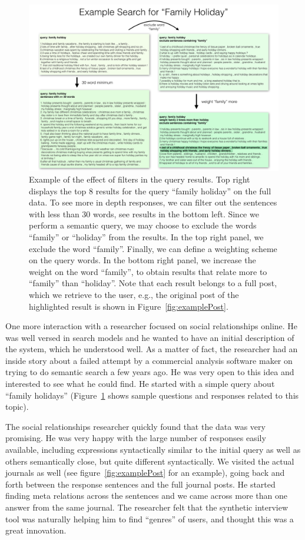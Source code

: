 \documentclass{sigchi}
\begin{document}
\begin{figure}[ht]
\centering \includegraphics[width=.85\textwidth]{figures/results_1}
\caption{Example of the effect of filters in the query results. 
Top right displays the top 8 results for the query ``family holiday'' on the full data. To see more in depth responses, we can filter out the sentences with less than 30 words, see results in the bottom left. Since we perform a semantic query, we may choose to exclude the words ``family'' or ``holiday'' from the results. In the top right panel, we exclude the word ``family''. Finally, we can define a weighting scheme on the query words. In the bottom right panel, we increase the weight on the word ``family'', to obtain results that relate more to ``family'' than ``holiday''. Note that each result belongs to a full post, which we retrieve to the user, e.g., the original post of the highlighted result is shown in Figure~\ref{fig:examplePost}. 
\label{fig:familyHolidays} }
\end{figure}

One more interaction with a researcher focused on social relationships online. He was well versed in search models and he wanted to have an initial description of the system, which he understood well. As a matter of fact, the researcher had an inside story about a failed attempt by a commercial analysis software maker on trying to do semantic search a few years ago. He was very open to this idea and interested to see what he could find. He started with a simple query about ``family holidays'' (Figure~\ref{fig:familyHolidays} shows sample questions and responses related to this topic).

The social relationships researcher quickly found that the data was very promising. He was very happy with the large number of responses easily available, including expressions syntactically similar to the initial query as well as others semantically close, but quite different syntactically. We visited the actual journals as well (see figure~\ref{fig:examplePost} for an example), going back and forth between the response sentences and the full journal posts. He started finding meta relations across the sentences and we came across more than one answer from the same journal. The researcher felt that the synthetic interview tool was naturally helping him to find ``genres'' of users, and thought this was a great innovation. 
\end{document}
